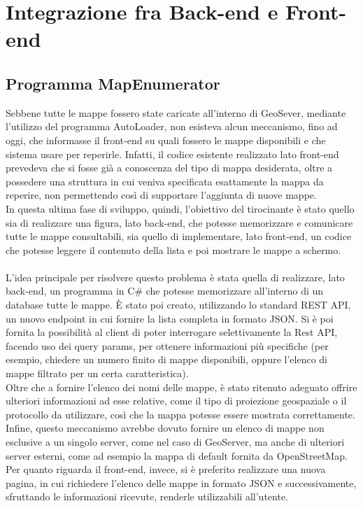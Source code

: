 \chapter{Integrazione fra Back-end e Front-end}
\label{cap:chapter7}

\section{Programma MapEnumerator}

Sebbene tutte le mappe fossero state caricate all'interno di GeoSever, mediante l'utilizzo del programma AutoLoader, non esisteva alcun meccanismo, fino ad oggi, che informasse il front-end su quali fossero le mappe disponibili e che sistema usare per reperirle. Infatti, il codice esistente realizzato lato front-end prevedeva che si fosse già a conoscenza del tipo di mappa desiderata, oltre a possedere una struttura in cui veniva specificata esattamente la mappa da reperire, non permettendo così di supportare l'aggiunta di nuove mappe. 
\\In questa ultima fase di sviluppo, quindi, l'obiettivo del tirocinante è stato quello sia di realizzare una figura, lato back-end, che potesse memorizzare e comunicare tutte le mappe consultabili, sia quello di implementare, lato front-end, un codice che potesse leggere il contenuto della lista e poi mostrare le mappe a schermo.
\\~\\
L'idea principale per risolvere questo problema è stata quella di realizzare, lato back-end, un programma in C\# che potesse memorizzare all'interno di un database tutte le mappe. È stato poi creato, utilizzando lo standard REST API, un nuovo endpoint in cui fornire la lista completa in formato JSON. Si è poi fornita la possibilità al client di poter interrogare selettivamente la Rest API, facendo uso dei query params, per ottenere informazioni più specifiche (per esempio, chiedere un numero finito di mappe disponibili, oppure l'elenco di mappe filtrato per un certa caratteristica). 
\\Oltre che a fornire l'elenco dei nomi delle mappe, è stato ritenuto adeguato offrire ulteriori informazioni ad esse relative, come il tipo di proiezione geospaziale o il protocollo da utilizzare, così che la mappa potesse essere mostrata correttamente. Infine, questo meccanismo avrebbe dovuto fornire un elenco di mappe non esclusive a un singolo server, come nel caso di GeoServer, ma anche di ulteriori server esterni, come ad esempio la mappa di default fornita da OpenStreetMap. 
\\Per quanto riguarda il front-end, invece, si è preferito realizzare una nuova pagina, in cui richiedere l'elenco delle mappe in formato JSON e successivamente, sfruttando le informazioni ricevute, renderle utilizzabili all'utente.   

